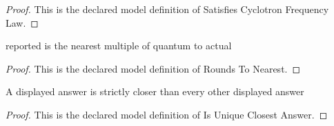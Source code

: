 \begin{proof}
  This is the declared model definition of Satisfies Cyclotron Frequency Law.
\end{proof}
\begin{definition}
  \label{def:physics:phyx-mini-0956:phyxminiproblems-problemphyxmini0956-roundstonearest}
  reported is the nearest multiple of quantum to actual
\end{definition}
\begin{proof}
  This is the declared model definition of Rounds To Nearest.
\end{proof}
\begin{definition}
  \label{def:physics:phyx-mini-0956:phyxminiproblems-problemphyxmini0956-isuniqueclosestanswer}
  A displayed answer is strictly closer than every other displayed answer
\end{definition}
\begin{proof}
  This is the declared model definition of Is Unique Closest Answer.
\end{proof}
